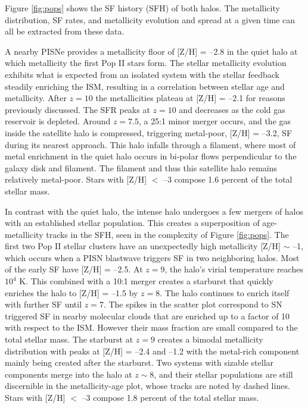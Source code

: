 \documentclass[12pt]{article}
\newcommand\tento[1]{$10^{#1}$}
\begin{document}
Figure \ref{fig:pops} shows the SF history (SFH) of both halos.  The
metallicity distribution, SF rates, and metallicity evolution and
spread at a given time can all be extracted from these data.

A nearby PISNe provides a metallicity floor of [Z/H] = --2.8 in the
quiet halo at which metallicity the first Pop II stars form.  The
stellar metallicity evolution exhibits what is expected from an
isolated system with the stellar feedback steadily enriching the ISM,
resulting in a correlation between stellar age and metallicity.  After
$z=10$ the metallicities plateau at [Z/H] = --2.1 for reasons
previously discussed.  The SFR peaks at $z=10$ and decreases as the
cold gas reservoir is depleted.  Around $z=7.5$, a 25:1 minor merger
occurs, and the gas inside the satellite halo is compressed,
triggering metal-poor, [Z/H] = --3.2, SF during its nearest approach.
This halo infalls through a filament, where most of metal enrichment
in the quiet halo occurs in bi-polar flows perpendicular to the galaxy
disk and filament.  The filament and thus this satellite halo remains
relatively metal-poor.  Stars with [Z/H] $<$ --3 compose 1.6 percent
of the total stellar mass.
       
In contrast with the quiet halo, the intense halo undergoes a few
mergers of halos with an established stellar population.  This creates
a superposition of age-metallicity tracks in the SFH, seen in the
complexity of Figure \ref{fig:pops}.  The first two Pop II stellar
clusters have an unexpectedly high metallicity [Z/H] $\sim$ --1, which
occurs when a PISN blastwave triggers SF in two neighboring halos.
Most of the early SF have [Z/H] = --2.5.  At $z=9$, the halo's virial
temperature reaches \tento{4} K.  This combined with a 10:1 merger
creates a starburst that quickly enriches the halo to [Z/H] = --1.5 by
$z=8$.  The halo continues to enrich itself with further SF until
$z=7$.  The spikes in the scatter plot correspond to SN triggered SF
in nearby molecular clouds that are enriched up to a factor of 10 with
respect to the ISM.  However their mass fraction are small compared to
the total stellar mass.  The starburst at $z=9$ creates a bimodal
metallicity distribution with peaks at [Z/H] = --2.4 and --1.2 with
the metal-rich component mainly being created after the starburst.
Two systems with sizable stellar components merge into the halo at $z
\sim 8$, and their stellar populations are still discernible in the
metallicity-age plot, whose tracks are noted by dashed lines.  Stars
with [Z/H] $<$ --3 compose 1.8 percent of the total stellar mass.
\end{document}
